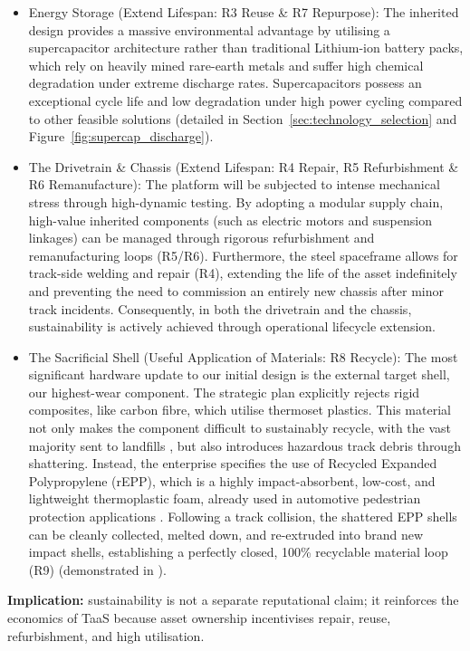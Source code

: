 \documentclass[11pt, a4paper]{report}
\numberwithin{equation}{section}
\begin{document}
\begin{refsection}
\begin{itemize}
    \item Energy Storage (Extend Lifespan: R3 Reuse \& R7 Repurpose): The inherited design provides a massive environmental advantage by utilising a supercapacitor architecture rather than traditional Lithium-ion battery packs, which rely on heavily mined rare-earth metals and suffer high chemical degradation under extreme discharge rates. Supercapacitors possess an exceptional cycle life and low degradation under high power cycling compared to other feasible solutions (detailed in Section~\ref{sec:technology_selection} and Figure~\ref{fig:supercap_discharge}).
    \item The Drivetrain \& Chassis (Extend Lifespan: R4 Repair, R5 Refurbishment \& R6 Remanufacture): The platform will be subjected to intense mechanical stress through high-dynamic testing. By adopting a modular supply chain, high-value inherited components (such as electric motors and suspension linkages) can be managed through rigorous refurbishment and remanufacturing loops (R5/R6). Furthermore, the steel spaceframe allows for track-side welding and repair (R4), extending the life of the asset indefinitely and preventing the need to commission an entirely new chassis after minor track incidents. Consequently, in both the drivetrain and the chassis, sustainability is actively achieved through operational lifecycle extension.
    \item The Sacrificial Shell (Useful Application of Materials: R8 Recycle): The most significant hardware update to our initial design is the external target shell, our highest-wear component. The strategic plan explicitly rejects rigid composites, like carbon fibre, which utilise thermoset plastics. This material not only makes the component difficult to sustainably recycle, with the vast majority sent to landfills \cite[p.~2]{morici_2022}, but also introduces hazardous track debris through shattering. Instead, the enterprise specifies the use of Recycled Expanded Polypropylene (rEPP), which is a highly impact-absorbent, low-cost, and lightweight thermoplastic foam, already used in automotive pedestrian protection applications \cite[p.~1]{ramaswamy_2017}. Following a track collision, the shattered EPP shells can be cleanly collected, melted down, and re-extruded into brand new impact shells, establishing a perfectly closed, 100\% recyclable material loop (R9) (demonstrated in \cite{handtke_2024}).
\end{itemize}

\noindent\textbf{Implication:} sustainability is not a separate reputational claim; it reinforces the economics of TaaS because asset ownership incentivises repair, reuse, refurbishment, and high utilisation.


\end{refsection}
\end{document}
